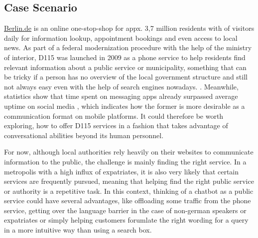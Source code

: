\subsection{Case Scenario}
\href{https://www.berlin.de}{Berlin.de} is an online one-stop-shop for appx. 3,7 million residents \cite{zensus} with  of visitors daily for information lookup, appointment bookings and even access to local news. As part of a federal modernization procedure with the help of the ministry of interior, D115 was launched in 2009 \cite{d115} as a phone service to help residents find relevant information about a public service or municipality, something that can be tricky if a person has no overview of the local government structure and still not always easy even with the help of search engines nowadays.
.
Meanwhile, statistics \cite{businsider} show that time spent on messaging apps already surpassed average uptime on social media , which indicates how the former is more desirable as a communication format on mobile platforms. It could therefore be worth exploring, how to offer D115 services in a fashion that takes advantage of conversational abilities beyond its human personnel. 

For now, although local authorities rely heavily on their websites to communicate information to the public, the challenge is mainly finding the right service. In a metropolis with a high influx of expatriates, it is also very likely that certain services are frequently pursued, meaning that helping find the right public service or authority is a repetitive task. In this context, thinking of a chatbot as a public service could have several advantages, like offloading some traffic from the phone service, getting over the language barrier in the case of non-german speakers or expatriates or simply helping customers forumlate the right wording for a query in a more intuitive way than using a search box. 




